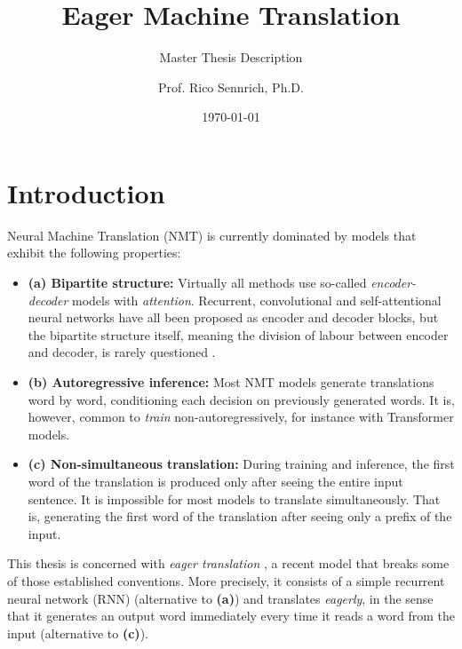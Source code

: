 \documentclass[english]{uzhpub}
\begin{document}
\title{Eager Machine Translation}

\subtitle{Master Thesis Description}

\author{Prof. Rico Sennrich, Ph.D.}

\date{\today}

\maketitle


\section{Introduction}

Neural Machine Translation (NMT) is currently dominated by models that exhibit the following properties:

\begin{itemize}
    \item \textbf{(a) Bipartite structure:} Virtually all methods use so-called \textit{encoder-decoder} models with \textit{attention}. Recurrent, convolutional and self-attentional neural networks have all been proposed as encoder and decoder blocks, but the bipartite structure itself, meaning the division of labour between encoder and decoder, is rarely questioned \cite{jointly.bahdanau2014neural,attentionisallyouneed,pmlr-v70-gehring17a}.
    \item \textbf{(b) Autoregressive inference:} Most NMT models generate translations word by word, conditioning each decision on previously generated words. It is, however, common to \textit{train} non-autoregressively, for instance with Transformer models.
    \item \textbf{(c) Non-simultaneous translation:} During training and inference, the first word of the translation is produced only after seeing the entire input sentence. It is impossible for most models to translate simultaneously. That is, generating the first word of the translation after seeing only a prefix of the input.
\end{itemize}


\noindent This thesis is concerned with \textit{eager translation} \cite{youmaynotneedattention}, a recent model that breaks some of those established conventions. More precisely, it consists of a simple recurrent neural network (RNN) (alternative to \textbf{(a)}) and translates \textit{eagerly}, in the sense that it generates an output word immediately every time it reads a word from the input (alternative to \textbf{(c)}).
\end{document}
